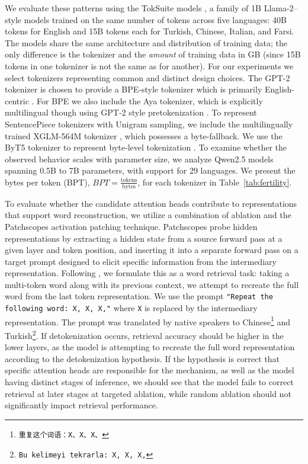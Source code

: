 \documentclass[11pt]{article}
\begin{document}
We evaluate these patterns using the TokSuite models \citep{altintas2025}, a family of 1B Llama-2–style models trained on the same number of tokens across five languages: 40B tokens for English and 15B tokens each for Turkish, Chinese, Italian, and Farsi. The models share the same architecture and distribution of training data; the only difference is the tokenizer and the \textit{amount} of training data in GB (since 15B tokens in one tokenizer is not the same as for another). For our experiments we select tokenizers representing common and distinct design choices. The GPT-2 tokenizer is chosen to provide a BPE-style tokenizer which is primarily English-centric \citep{gpt2}. For BPE we also include the Aya tokenizer, which is explicitly multilingual though using GPT-2 style pretokenization \citep{aya}. To represent SentencePiece tokenizers with Unigram sampling, we include the multilingually trained XGLM-564M tokenizer \citep{xglm}, which possesses a byte-fallback. We use the ByT5 tokenizer to represent byte-level tokenization \citep{xue2022}. To examine whether the observed behavior scales with parameter size, we analyze Qwen2.5 models \citep{qwen2.5, qwen2} spanning 0.5B to 7B parameters, with support for 29 languages. We present the bytes per token (BPT), $BPT = \frac{\text{tokens}}{\text{bytes}}$, for each tokenizer in Table~\ref{tab:fertility}.

To evaluate whether the candidate attention heads contribute to representations that support word reconstruction, we utilize a combination of ablation and the Patchscopes \citep{ghandeharioun2024} activation patching technique. Patchscopes probe hidden representations by extracting a hidden state from a source forward pass at a given layer and token position, and inserting it into a separate forward pass on a target prompt designed to elicit specific information from the intermediary representation. Following \citet{kaplan2025}, we formulate this as a word retrieval task: taking a multi-token word along with its previous context, we attempt to recreate the full word from the last token representation. We use the prompt \texttt{"Repeat the following word: X, X, X,"} where \texttt{X} is replaced by the intermediary representation. The  prompt was translated by native speakers to Chinese\footnote{\texttt{重复这个词语：X、X、X、}} and Turkish\footnote{\texttt{Bu kelimeyi tekrarla: X, X, X,}}. If detokenization occurs, retrieval accuracy should be higher in the lower layers, as the model is attempting to recreate the full word representation according to the detokenization hypothesis. If the hypothesis is correct that specific attention heads are responsible for the mechanism, as well as the model having distinct stages of inference, we should see that the model fails to correct retrieval at later stages at targeted ablation, while random ablation should not significantly impact retrieval performance.
\end{document}
